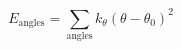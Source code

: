 \begin{equation}
E_\mathrm{angles} = \sum_\mathrm{angles} k_\theta (\theta-\theta_0)^2
\end{equation}
